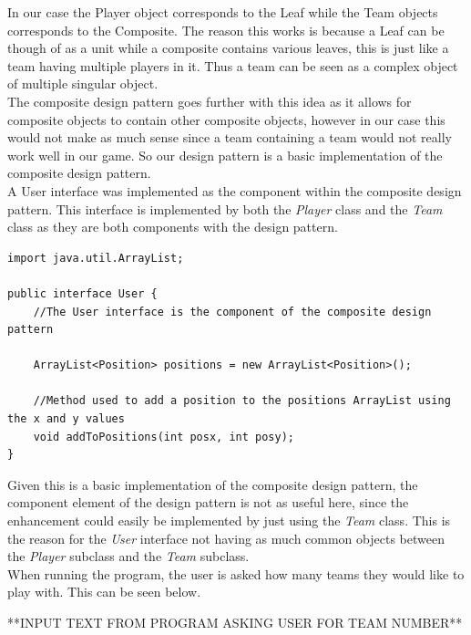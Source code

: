 \documentclass[a4paper,12pt]{extarticle}
\begin{document}
\noindent In our case the Player object corresponds to the Leaf while the Team objects  corresponds to the Composite. The reason this works is because a Leaf can be though of as a unit while a composite contains various leaves, this is just like a team having multiple players in it. Thus a team can be seen as a complex object of multiple singular object.\\

The composite design pattern goes further with this idea as it allows for composite objects to contain other composite objects, however in our case this would not make as much sense since a team containing a team would not really work well in our game. So our design pattern is a basic implementation of the composite design pattern.\\

A User interface was implemented as the component within the composite design pattern. This interface is implemented by both the \textit{Player} class and the \textit{Team} class as they are both components with the design pattern.\\

\vspace{-1mm}
\begin{lstlisting}
import java.util.ArrayList;

public interface User {
    //The User interface is the component of the composite design pattern

    ArrayList<Position> positions = new ArrayList<Position>();

    //Method used to add a position to the positions ArrayList using the x and y values
    void addToPositions(int posx, int posy);
}
\end{lstlisting}
\vspace{-1mm}

Given this is a basic implementation of the composite design pattern, the component element of the design pattern is not as useful here, since the enhancement could easily be implemented by just using the \textit{Team} class. This is the reason for the \textit{User} interface not having as much common objects between the \textit{Player} subclass and the \textit{Team} subclass.\\

When running the program, the user is asked how many teams they would like to play with. This can be seen below.

**INPUT TEXT FROM PROGRAM ASKING USER FOR TEAM NUMBER**\\
\end{document}
